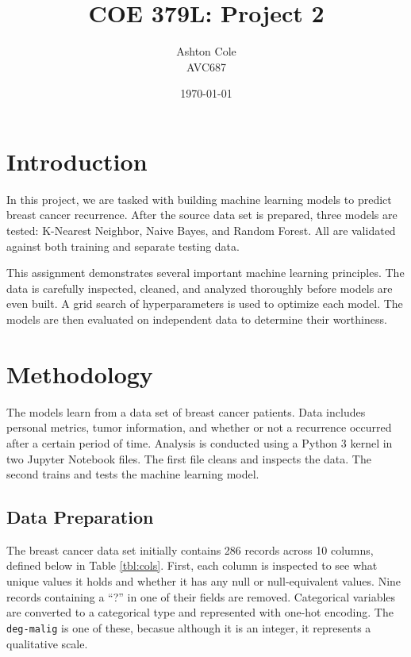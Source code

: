 \documentclass{article}
\title{COE 379L: Project 2}
\author{Ashton Cole\\AVC687}
\date{\today}
\begin{document}
\maketitle

\section{Introduction}

In this project, we are tasked with building machine learning models to predict breast cancer recurrence. After the source data set is prepared, three models are tested: K-Nearest Neighbor, Naive Bayes, and Random Forest. All are validated against both training and separate testing data.

This assignment demonstrates several important machine learning principles. The data is carefully inspected, cleaned, and analyzed thoroughly before models are even built. A grid search of hyperparameters is used to optimize each model. The models are then evaluated on independent data to determine their worthiness.

\section{Methodology}

The models learn from a data set of breast cancer patients. Data includes personal metrics, tumor information, and whether or not a recurrence occurred after a certain period of time. Analysis is conducted using a Python 3 kernel in two Jupyter Notebook files. The first file cleans and inspects the data. The second trains and tests the machine learning model.

\subsection{Data Preparation}

The breast cancer data set initially contains 286 records across 10 columns, defined below in Table \ref{tbl:cols}. First, each column is inspected to see what unique values it holds and whether it has any null or null-equivalent values. Nine records containing a ``?'' in one of their fields are removed. Categorical variables are converted to a categorical type and represented with one-hot encoding. The \verb|deg-malig| is one of these, becasue although it is an integer, it represents a qualitative scale.
\end{document}
